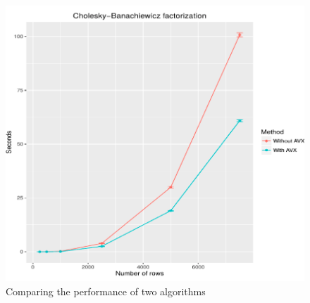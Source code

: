 \documentclass[sigplan]{acmart}
\begin{document}
\begin{figure}[H]
  \begin{center}
  \includegraphics[width=\linewidth]{img/experiment}
  \caption{Comparing the performance of two algorithms}
  \end{center}
\end{figure}




\end{document}
